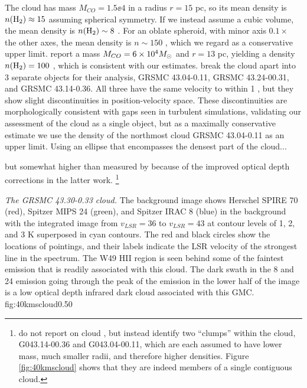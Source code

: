 % 
% 
The cloud has mass $M_{CO} = 1.5\ee{4}$ \msun in a radius $r=15$ pc, so its
mean density is $n(\textrm{H}_{2}) \approx 15$ \percc assuming spherical symmetry.  If we
instead assume a cubic volume, the mean density is $n(\textrm{H}_{2})\sim8$ \percc.  For
an oblate spheroid, with minor axis $0.1\times$ the other axes, the mean
density is $n\sim150$ \percc, which we regard as a conservative upper limit.
\citet{Simon2001a} report a mass $M_{CO} = 6\times10^{4} M_{\odot}$ and $r=13$ pc,
yielding a density $n(\textrm{H}_{2})=100$ \percc, which is consistent with our estimates.
\citet{Roman-Duval2010a} break the cloud apart into 3 separate objects for their
analysis, GRSMC 43.04-0.11, GRSMC 43.24-00.31, and GRSMC 43.14-0.36.  All three
have the same velocity to within 1 \kms, but they show slight discontinuities
in position-velocity space.  These discontinuities are morphologically consistent
with gaps seen in turbulent simulations, validating our assessment of the cloud as a
single object, but as a maximally conservative estimate we use the density of the
northmost cloud GRSMC 43.04-0.11 as an upper limit.  Using an ellipse that encompasses
the densest part of the cloud...

but somewhat higher than measured by \citet{Roman-Duval2010a} because of the
improved optical depth corrections in the latter work.%
\footnote{\citet{Roman-Duval2010a} do not report on cloud \GRSMC, but instead
identify two ``clumps'' within the cloud, G043.14-00.36 and G043.04-00.11,
which are each assumed to have lower mass, much smaller radii, and therefore
higher densities.  Figure \ref{fig:40kmscloud} shows that they are indeed members
of a single contiguous cloud.}



{\textit{The GRSMC 43.30-0.33 cloud.}  The background image shows Herschel SPIRE 70 \um (red),
Spitzer MIPS 24 \um (green), and Spitzer IRAC 8 \um (blue) in the background with
the \thirteenco integrated image from $v_{LSR}=36$ \kms to $v_{LSR}=43$ \kms at contour levels of
1, 2, and 3 K \kms superposed in cyan contours.  The red and black circles
show the locations of \formaldehyde pointings, and their labels indicate the LSR velocity
of the strongest line in the spectrum.  The W49 HII region is seen
behind some of the faintest \thirteenco emission that is readily associated
with this cloud.  The dark swath in the 8 and 24 \um emission going through the
peak of the \thirteenco emission in the lower half of the image is a low
optical depth infrared dark cloud associated with this GMC.}
{fig:40kmscloud}{0.5}{0}

